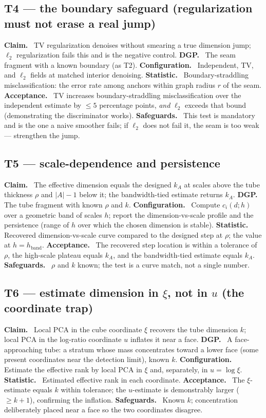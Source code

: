 \documentclass[11pt]{article}
\theoremstyle{definition}
\newcommand{\field}[1]{\smallskip\noindent\textbf{\textsf{#1.}}\ }
\begin{document}
\subsection{T4 --- the boundary safeguard (regularization must not erase a real jump)}
\field{Claim} TV regularization denoises without smearing a true dimension jump;
$\ell_2$ regularization fails this and is the negative control.
\field{DGP} The seam fragment with a known boundary (as T2).
\field{Configuration} Independent, TV, and $\ell_2$ fields at matched interior
denoising.
\field{Statistic} Boundary-straddling misclassification: the error rate among
anchors within graph radius $r$ of the seam.
\field{Acceptance} TV increases boundary-straddling misclassification over the
independent estimate by $\le 5$ percentage points, \emph{and} $\ell_2$ exceeds
that bound (demonstrating the discriminator works).
\field{Safeguards} This test is mandatory and is the one a naive smoother fails;
if $\ell_2$ does not fail it, the seam is too weak --- strengthen the jump.

\subsection{T5 --- scale-dependence and persistence}
\field{Claim} The effective dimension equals the designed $k_A$ at scales above
the tube thickness $\rho$ and $|A|-1$ below it; the bandwidth-tied estimate
returns $k_A$.
\field{DGP} The tube fragment with known $\rho$ and $k$.
\field{Configuration} Compute $c_i(d;h)$ over a geometric band of scales $h$;
report the dimension-vs-scale profile and the persistence (range of $h$ over which
the chosen dimension is stable).
\field{Statistic} Recovered dimension-vs-scale curve compared to the designed step
at $\rho$; the value at $h=h_{\text{band}}$.
\field{Acceptance} The recovered step location is within a tolerance of $\rho$,
the high-scale plateau equals $k_A$, and the bandwidth-tied estimate equals $k_A$.
\field{Safeguards} $\rho$ and $k$ known; the test is a curve match, not a single
number.

\subsection{T6 --- estimate dimension in $\xi$, not in $u$ (the coordinate trap)}
\field{Claim} Local PCA in the cube coordinate $\xi$ recovers the tube dimension
$k$; local PCA in the log-ratio coordinate $u$ inflates it near a face.
\field{DGP} A face-approaching tube: a stratum whose mass concentrates toward a
lower face (some present coordinates near the detection limit), known $k$.
\field{Configuration} Estimate the effective rank by local PCA in $\xi$ and,
separately, in $u=\log\xi$.
\field{Statistic} Estimated effective rank in each coordinate.
\field{Acceptance} The $\xi$-estimate equals $k$ within tolerance; the
$u$-estimate is demonstrably larger ($\ge k+1$), confirming the inflation.
\field{Safeguards} Known $k$; concentration deliberately placed near a face so the
two coordinates disagree.
\end{document}
